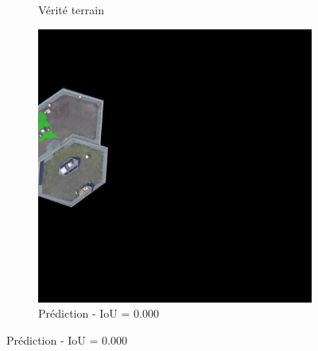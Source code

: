 \begin{figure}[H]
\begin{subfigure}{0.32\textwidth}
    \caption{Vérité terrain}
\end{subfigure}
\hfill
\begin{subfigure}{0.32\textwidth}
    \includegraphics[width=\textwidth]{02-main//figures/ch4/kfold_ensembles/upernet_tu-efficientnetv2_rw_s.ra2_in1k/worst_cases/worst_5_iou0.000_25001117_tile_3_9_5ba8f7_overlay_pred.png}
    \caption{Prédiction - IoU = 0.000}
\end{subfigure}

\vspace{0.35cm}


\end{figure}
